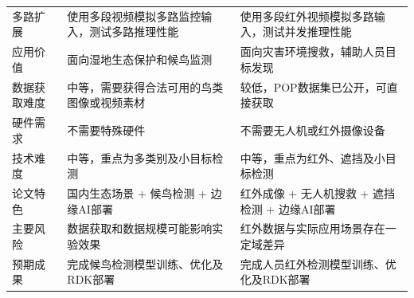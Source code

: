 \begin{table}[htbp]
\begin{tabularx}{\textwidth}{
        >{\centering\arraybackslash}p{2.4cm}
        >{\raggedright\arraybackslash}X
        >{\raggedright\arraybackslash}X
    }
        多路扩展
        & 使用多段视频模拟多路监控输入，测试多路推理性能
        & 使用多段红外视频模拟多路输入，测试并发推理性能 \\

        应用价值
        & 面向湿地生态保护和候鸟监测
        & 面向灾害环境搜救，辅助人员目标发现 \\

        数据获取难度
        & 中等，需要获得合法可用的鸟类图像或视频素材
        & 较低，POP数据集已公开，可直接获取 \\

        硬件需求
        & 不需要特殊硬件
        & 不需要无人机或红外摄像设备 \\

        技术难度
        & 中等，重点为多类别及小目标检测
        & 中等，重点为红外、遮挡及小目标检测 \\

        论文特色
        & 国内生态场景 + 候鸟检测 + 边缘AI部署
        & 红外成像 + 无人机搜救 + 遮挡检测 + 边缘AI部署 \\

        主要风险
        & 数据获取和数据规模可能影响实验效果
        & 红外数据与实际应用场景存在一定域差异 \\

        预期成果
        & 完成候鸟检测模型训练、优化及RDK部署
        & 完成人员红外检测模型训练、优化及RDK部署 \\

        \hline
    \end{tabularx}
\end{table}